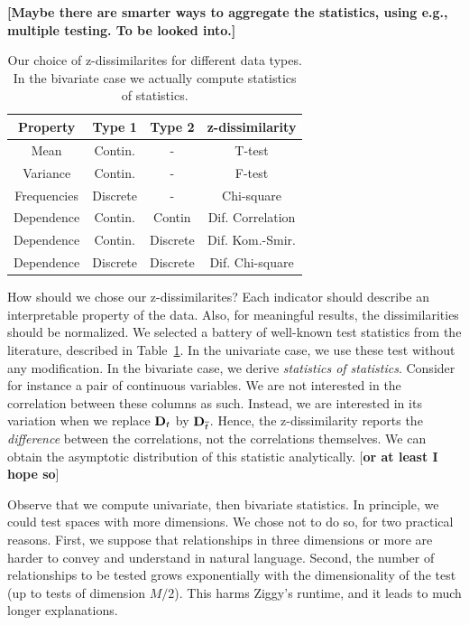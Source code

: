 \textbf{[Maybe there are smarter ways to aggregate the statistics, using e.g.,
multiple testing. To be looked into.]}

\begin{table}[t!]
    \centering
    \begin{tabular}{|c|c|c|c|}
      \hline
      Property & Type 1 & Type 2 & z-dissimilarity \\
      \hline
      Mean        & Contin.  & - & T-test\\
      Variance    & Contin.  & - & F-test\\
      Frequencies & Discrete & - & Chi-square\\
      \hline
      Dependence  & Contin. & Contin & Dif. Correlation\\
      Dependence  & Contin. & Discrete & Dif. Kom.-Smir.\\
      Dependence  & Discrete & Discrete & Dif. Chi-square \\
      \hline
    \end{tabular}
\caption{Our choice of z-dissimilarites for different data types. In the
bivariate case we actually compute statistics of statistics.}
    \label{tab:dissim}
\end{table}

How should we chose our z-dissimilarites? Each indicator should describe an
interpretable property of the data. Also, for meaningful results, the
dissimilarities should be normalized. We selected a battery of well-known test
statistics from the literature, described in Table~\ref{tab:dissim}. In the
univariate case, we use these test without any modification. In the bivariate
case, we derive \emph{statistics of statistics}. Consider for instance a pair
of continuous variables. We are not interested in the correlation between these
columns as such. Instead, we are interested in its variation when we replace
$\mathbf{D}_{t}$ by $\mathbf{D}_{\overline{t}}$. Hence, the z-dissimilarity reports the
\emph{difference} between the correlations, not the correlations themselves. We can
obtain the asymptotic distribution of this statistic analytically.
[\textbf{or at least I hope so}]

Observe that we compute univariate, then bivariate statistics. In principle, we
could test spaces with more dimensions. We chose not to do so, for two
practical reasons. First, we suppose that relationships in three
dimensions or more are harder to convey and understand in natural language.
Second, the number of relationships to be tested grows exponentially with the
dimensionality of the test (up to tests of dimension $M/2$). This harms Ziggy's
runtime, and it leads to much longer explanations.


